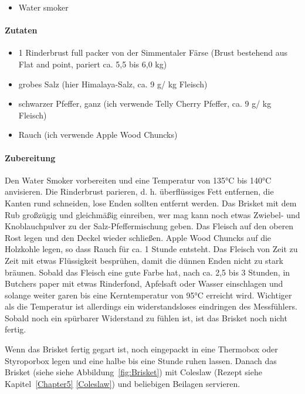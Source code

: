 \begin{itemize}[noitemsep]
	\item Water smoker
\end{itemize}

\paragraph{Zutaten}

\begin{itemize}[noitemsep]
	\item 1 Rinderbrust full packer von der Simmentaler Färse (Brust bestehend aus Flat and point, pariert ca. 5,5 bis 6,0 kg)
	\item grobes Salz (hier Himalaya-Salz, ca. 9 g/ kg Fleisch)
	\item schwarzer Pfeffer, ganz (ich verwende Telly Cherry Pfeffer, ca. 9 g/ kg Fleisch)
	\item Rauch (ich verwende Apple Wood Chuncks)	
\end{itemize}

\paragraph{Zubereitung}

Den Water Smoker vorbereiten und eine Temperatur von 135°C bis 140°C anvisieren.
Die Rinderbrust parieren, d. h. überflüssiges Fett entfernen, die Kanten rund schneiden, 
lose Enden sollten entfernt werden. Das Brisket mit dem Rub großzügig und gleichmäßig 
einreiben, wer mag kann noch etwas Zwiebel- und Knoblauchpulver zu der 
Salz-Pfeffermischung geben. Das Fleisch auf den oberen Rost legen und den Deckel 
wieder schließen. Apple Wood Chuncks auf die Holzkohle legen, so dass Rauch für ca. 1 
Stunde entsteht. Das Fleisch von Zeit zu Zeit mit etwas Flüssigkeit besprühen, damit die 
dünnen Enden nicht zu stark bräunen. Sobald das Fleisch eine gute Farbe hat, nach ca. 
2,5 bis 3 Stunden, in Butchers paper mit etwas Rinderfond, Apfelsaft oder Wasser einschlagen
und solange weiter garen bis eine Kerntemperatur von 95°C erreicht wird. Wichtiger als 
die Temperatur ist allerdings ein widerstandsloses eindringen des Messfühlers. Sobald 
noch ein spürbarer Widerstand zu fühlen ist, ist das Brisket noch nicht fertig. 

Wenn das Brisket fertig gegart ist, noch eingepackt in eine Thermobox oder Styroporbox 
legen und eine halbe bis eine Stunde ruhen lassen. Danach das Brisket (siehe siehe Abbildung~\vref{fig:Brisket}) mit Coleslaw
 (Rezept siehe Kapitel~\ref{Chapter5} \vref{Coleslaw}) und beliebigen Beilagen servieren.

